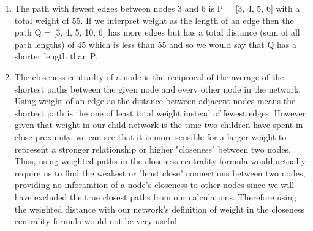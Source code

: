 \documentclass{article}
\begin{document}
\begin{enumerate}[label=(\alph*), left=10pt, itemsep=10pt]
        \item \begin{minipage}[t]{0.9\textwidth}
            The path with fewest edges between nodes 3 and 6 is P = [3, 4, 5, 6] with a total weight of 55.
            If we interpret weight as the length of an edge then the path Q = [3, 4, 5, 10, 6] has more edges but
            has a total distance (sum of all path lengths) of 45 which is less than 55 and so we would say that
            Q has a shorter length than P.
        \end{minipage}

        \item \begin{minipage}[t]{0.9\textwidth}
            The closeness centrailty of a node is the reciprocal of the average of the shortest paths between the given
            node and every other node in the network. Using weight of an edge as the distance between adjacent nodes means the
            shortest path is the one of least total weight instead of fewest edges. However, given that weight in our child
            network is the time two children have spent in close proximity, we can see that it is more sensible for a larger
            weight to represent a stronger relationship or higher "closeness" between two nodes. Thus, using weighted paths in
            the closeness centrality formula would actually require us to find the weakest or "least close" connections
            between two nodes, providing no inforamtion of a node's closeness to other nodes since we will have excluded the
            true closest paths from our calculations. Therefore using the weighted distance with our network's definition of
            weight in the closeness centrality formula would not be very useful.
        \end{minipage}


\end{enumerate}
\end{document}
